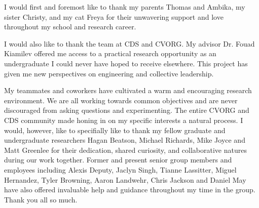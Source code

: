 I would first and foremost like to thank my parents Thomas and Ambika, my sister Christy, and my cat Freya for their unwavering support and love throughout my school and research career. \par
I would also like to thank the team at CDS and CVORG. My advisor Dr. Fouad Kiamilev offered me access to a practical research opportunity as an undergraduate I could never have hoped to receive elsewhere. This project has given me new perspectives on engineering and collective leadership. \par
My teammates and coworkers have cultivated a warm and encouraging research environment. We are all working towards common objectives and are never discouraged from asking questions and experimenting. The entire CVORG and CDS community made honing in on my specific interests a natural process. I would, however, like to specifially like to thank my fellow graduate and undergraduate researchers Hagan Beatson, Michael Richards, Mike Joyce and Matt Greenlee for their dedication, shared curiosity, and collaborative natures during our work together. Former and present senior group members and employees including Alexis Deputy, Jaclyn Singh, Tianne Lassitter, Miguel Hernandez, Tyler Browning, Aaron Landwehr, Chris Jackson and Daniel May have also offered invaluable help and guidance throughout my time in the group. Thank you all so much.